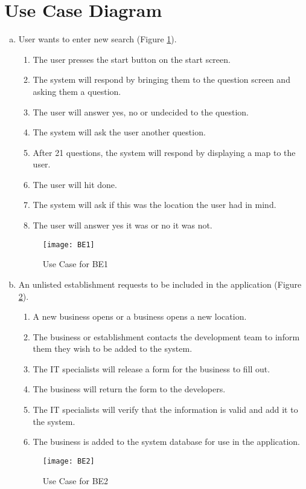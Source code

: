\documentclass[titlepage]{article}
\begin{document}
\section{Use Case Diagram}
\label{sec:use_case_diagram}
\begin{enumerate}[a)]
	
	\item User wants to enter new search (Figure \ref{usecase:search}).
		\begin{enumerate}[{BE1}.1]
			\item The user presses the start button on the start screen.
			\item The system will respond by bringing them to the question screen and asking them a question.
			\item The user will answer yes, no or undecided to the question.
			\item The system will ask the user another question.
			\item After 21 questions, the system will respond by displaying a map to the user.
			\item The user will hit done.
			\item The system will ask if this was the location the user had in mind.
			\item The user will answer yes it was or no it was not.
		\end{enumerate}
	\begin{center}
		\begin{figure}[H]
			\texttt{[image: BE1]}
			\caption{Use Case for BE1}\label{usecase:search}
		\end{figure}
	\end{center}

	\item An unlisted establishment requests to be included in the application (Figure \ref{usecase:new_esta}).
		\begin{enumerate}[{BE2}.1]
			\item A new business opens or a business opens a new location.
			\item The business or establishment contacts the development team to inform them they wish to be added to the system.
			\item The IT specialists will release a form for the business to fill out.
			\item The business will return the form to the developers.
			\item The IT specialists will verify that the information is valid and add it to the system.
			\item The business is added to the system database for use in the application.
		\end{enumerate}
	\begin{center}
		\begin{figure}[H]
			\texttt{[image: BE2]}
			\caption{Use Case for BE2}\label{usecase:new_esta}
		\end{figure}
	\end{center}



\end{enumerate}
\end{document}
